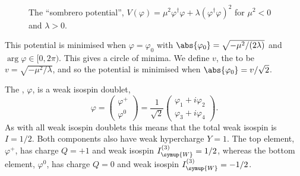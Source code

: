 \documentclass[fleqn]{NotesClass}
\newcommand{\Pparticle}[1]{\symup{#1}}
\newcommand{\PW}{\ensuremath{\Pparticle{W}}}
\newcommand{\hermit}{\dagger}
\begin{document}
    \begin{figure}
        \caption{The \enquote{sombrero potential}, \(V(\varphi) = \mu^2\varphi^\hermit\varphi + \lambda(\varphi^\hermit\varphi)^2\) for \(\mu^2 < 0\) and \(\lambda > 0\).}
        \label{fig:sombrero potential}
    \end{figure}
    
    This potential is minimised when \(\varphi = \varphi_0\) with \(\abs{\varphi_0} = \sqrt{-\mu^2/(2\lambda)}\) and \(\arg \varphi \in [0, 2\pi)\).
    This gives a circle of minima.
    We define \(v\), the  to be \(v = \sqrt{-\mu^2/\lambda}\), and so the potential is minimised when \(\abs{\varphi_0} = v/\sqrt{2}\).
    
    The , \(\varphi\), is a weak isospin doublet,
    \begin{equation}
        \varphi = 
        \begin{pmatrix}
            \varphi^+\\ \varphi^0
        \end{pmatrix}
        = \frac{1}{\sqrt{2}}
        \begin{pmatrix}
            \varphi_1 + i\varphi_2\\ \varphi_3 + i\varphi_4
        \end{pmatrix}
        .
    \end{equation}
    As with all weak isospin doublets this means that the total weak isospin is \(I = 1/2\).
    Both components also have weak hypercharge \(Y = 1\).
    The top element, \(\varphi^+\), has charge \(Q = +1\) and weak isospin \(I_{\PW}^{(3)} = 1/2\), whereas the bottom element, \(\varphi^0\), has charge \(Q = 0\) and weak isospin \(I_{\PW}^{(3)} = -1/2\).
    
\end{document}
